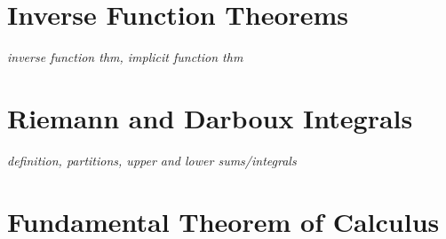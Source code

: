 \documentclass[../../../main.tex]{subfiles}
\begin{document}
\section{Inverse Function Theorems}
\textit{inverse function thm, implicit function thm}
\section{Riemann and Darboux Integrals}
\textit{definition, partitions, upper and lower sums/integrals}
\section{Fundamental Theorem of Calculus}

\printbibliography[
    heading=subbibintoc,
    title={References}
]
\end{document}

